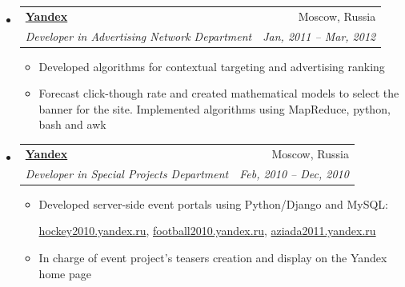 \documentclass[letterpaper,11pt]{article}
\makeatletter
\newcommand{\resitem}[1]{\item #1 \vspace{-2pt}}
\newcommand{\ressubheading}[4]{
\begin{tabular*}{6.5in}{l@{\extracolsep{\fill}}r}
		\textbf{#1} & #2 \\
		\textit{#3} & \textit{#4} \\
\end{tabular*}\vspace{-6pt}}
\makeatother
\begin{document}
\begin{itemize}
\item
	\ressubheading{\href{http://yandex.com/}{Yandex}}{Moscow, Russia}{Developer in Advertising Network Department}{Jan, 2011 -- Mar, 2012}
	\begin{itemize}
		\resitem{Developed algorithms for contextual targeting and advertising ranking}
		\resitem{Forecast click-though rate and created mathematical models to select the banner for the site. Implemented algorithms using MapReduce, python, bash and awk}
	\end{itemize}

	

\item
	\ressubheading{\href{http://yandex.com/}{Yandex}}{Moscow, Russia}{Developer in Special Projects Department}{Feb, 2010 -- Dec, 2010}
	\begin{itemize}
		\resitem{Developed server-side event portals using Python/Django and MySQL:
	
	    \href{http://hockey2010.yandex.ru}{hockey2010.yandex.ru},
	    \href{http://football2010.yandex.ru}{football2010.yandex.ru},
	    \href{http://aziada2011.yandex.ru}{aziada2011.yandex.ru}}
		\resitem{In charge of event project's teasers creation and display on the Yandex home page}
	\end{itemize}
	
	
\end{itemize}
\end{document}
